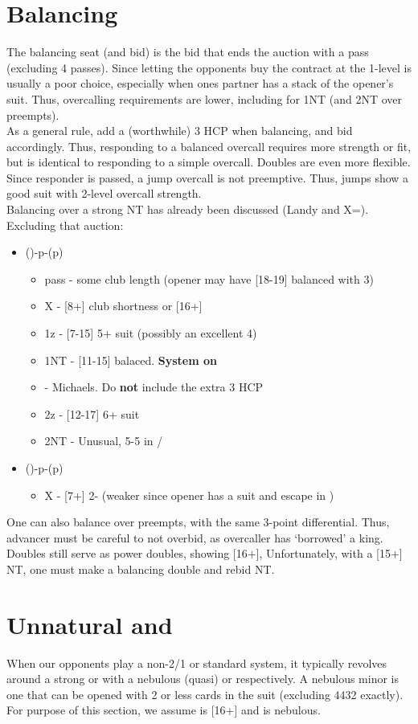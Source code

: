 \documentclass[12pt]{report}
\newcommand{\n}{\\}
\newcommand{\q}[1]{\multido{}{#1}{\qquad}}
\newcommand{\ul}[1]{\begin{itemize}#1\end{itemize}}
\newcommand{\li}[1]{\item[~] \q{#1}}
\newcommand{\bidsection}[2]{\section{\texorpdfstring{#1}{#2}}}
\begin{document}
\section{Balancing} \label{4:7}

    The balancing seat (and bid) is the bid that ends the auction with a pass (excluding 4 passes).  Since letting the opponents buy the contract at the 1-level is usually a poor choice, especially when ones partner has a stack of the opener's suit.  Thus, overcalling requirements are lower, including for 1NT (and 2NT over preempts). \n

    As a general rule, add a (worthwhile) 3 HCP when balancing, and bid accordingly.  Thus, responding to a balanced overcall requires more strength or fit, but is identical to responding to a simple overcall.  Doubles are even more flexible. \n
    
    Since responder is passed, a jump overcall is not preemptive.  Thus, jumps show a good suit with 2-level overcall strength. \n

    Balancing over a strong NT has already been discussed (Landy and X=\cl{}).  Excluding that auction:

    \ul {
        \li0 ()-p-(p)
        \ul {
            \li0 pass - some club length (opener may have [18-19] balanced with 3\cl{})
            \li0 X - [8+] club shortness or [16+]
            \li0 1z - [7-15] 5+ suit (possibly an excellent 4)
            \li0 1NT - [11-15] balaced.  \textbf{System on}
            \li0 \cl2 - Michaels.  Do \textbf{not} include the extra 3 HCP
            \li0 2z - [12-17] 6+ suit
            \li0 2NT - Unusual, 5-5 in \di{}/\he{}
        }
        \li0 (\he1)-p-(p)
        \ul {
            \li0 X - [7+] 2-\he{} (weaker since opener has a suit and escape in \sp1)
        }
    }

    One can also balance over preempts, with the same 3-point differential. Thus, advancer must be careful to not overbid, as overcaller has `borrowed' a king. \n
    
    Doubles still serve as power doubles, showing [16+], Unfortunately, with a [15+] NT, one must make a balancing double and rebid NT.

\bidsection{Unnatural  and }{Unnatural 1♣ and 1♢}\label{4:8}

    When our opponents play a non-2/1 or standard system, it typically revolves around a strong  or  with a nebulous (quasi)  or  respectively.  A nebulous minor is one that can be opened with 2 or less cards in the suit (excluding 4432 exactly).  For purpose of this section, we assume  is [16+] and  is nebulous. \n
\end{document}
